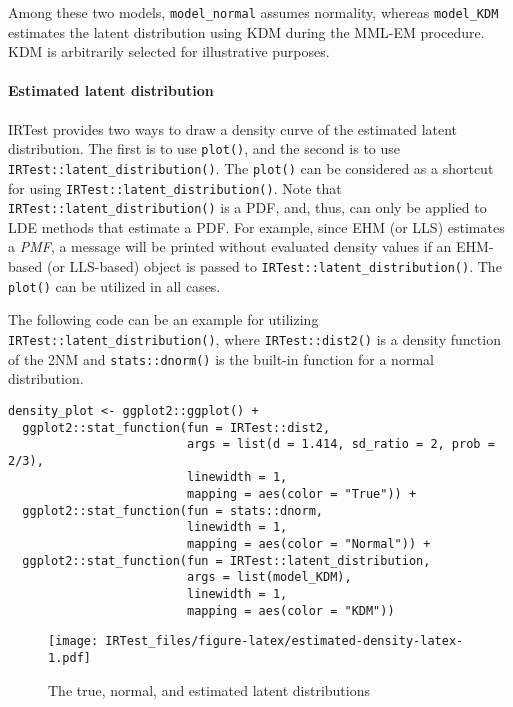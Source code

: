 Among these two models, \texttt{model\_normal} assumes normality, whereas
\texttt{model\_KDM} estimates the latent distribution using KDM during the
MML-EM procedure. KDM is arbitrarily selected for illustrative purposes.

\hypertarget{estimated-latent-distribution}{%
\paragraph{Estimated latent distribution}\label{estimated-latent-distribution}}

IRTest provides two ways to draw a density curve of the estimated latent
distribution. The first is to use \texttt{plot()}, and the second is to use
\texttt{IRTest::latent\_distribution()}. The \texttt{plot()} can be considered as a
shortcut for using \texttt{IRTest::latent\_distribution()}. Note that
\texttt{IRTest::latent\_distribution()} is a PDF, and, thus, can only be applied
to LDE methods that estimate a PDF. For example, since EHM (or LLS)
estimates a \emph{PMF}, a message will be printed without evaluated density
values if an EHM-based (or LLS-based) object is passed to
\texttt{IRTest::latent\_distribution()}. The \texttt{plot()} can be utilized in all
cases.

The following code can be an example for utilizing
\texttt{IRTest::latent\_distribution()}, where \texttt{IRTest::dist2()} is a density
function of the 2NM and \texttt{stats::dnorm()} is the built-in function for a
normal distribution.

\begin{verbatim}
density_plot <- ggplot2::ggplot() +
  ggplot2::stat_function(fun = IRTest::dist2,
                         args = list(d = 1.414, sd_ratio = 2, prob = 2/3),
                         linewidth = 1,
                         mapping = aes(color = "True")) +
  ggplot2::stat_function(fun = stats::dnorm,
                         linewidth = 1,
                         mapping = aes(color = "Normal")) +
  ggplot2::stat_function(fun = IRTest::latent_distribution,
                         args = list(model_KDM),
                         linewidth = 1,
                         mapping = aes(color = "KDM"))
\end{verbatim}

\begin{figure}
\hypertarget{fig:estimated-density-latex}{%
\centering
\texttt{[image: IRTest\_files/figure-latex/estimated-density-latex-1.pdf]}
\caption{The true, normal, and estimated latent
distributions}\label{fig:estimated-density-latex}
}
\end{figure}

